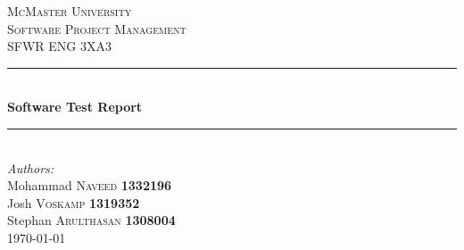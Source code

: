 \documentclass[12pt]{article}
\begin{document}
\sloppy

\begin{titlepage}

\newcommand{\HRule}{\rule{\linewidth}{0.5mm}} %

\center %


\textsc{\LARGE McMaster University}\\[1.5cm] %
\textsc{\Large Software Project Management}\\[0.5cm] %
\textsc{\large SFWR ENG 3XA3}\\[0.5cm] %


\HRule \\[0.4cm]
{ \huge \bfseries Software Test Report}\\[0.4cm] %
\HRule \\[1.5cm]




\Large \emph{Authors:}\\
Mohammad \textsc{Naveed} \textbf{1332196} \\ %
Josh \textsc{Voskamp} \textbf{1319352} \\
Stephan \textsc{Arulthasan} \textbf{1308004} \\[3cm]

{\large \today}\\[3cm] %


\end{titlepage}
\end{document}
